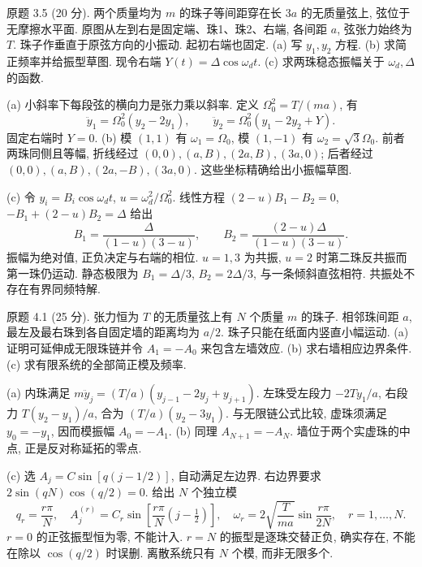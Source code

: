 \begin{exercise}\label{ps:3.5}
原题 3.5 (20 分). 两个质量均为 $m$ 的珠子等间距穿在长 $3a$ 的无质量弦上, 弦位于无摩擦水平面. 原图从左到右是固定端、珠1、珠2、右端, 各间距 $a$, 弦张力始终为 $T$. 珠子作垂直于原弦方向的小振动. 起初右端也固定. (a) 写 $y_1,y_2$ 方程. (b) 求简正频率并给振型草图. 现令右端 $Y(t)=\Delta\cos\omega_dt$. (c) 求两珠稳态振幅关于 $\omega_d,\Delta$ 的函数.
\end{exercise}
\begin{solution}
(a) 小斜率下每段弦的横向力是张力乘以斜率. 定义 $\Omega_0^2=T/(ma)$, 有
\[
\ddot y_1=\Omega_0^2(y_2-2y_1),\qquad
\ddot y_2=\Omega_0^2(y_1-2y_2+Y).
\]
固定右端时 $Y=0$. (b) 模 $(1,1)$ 有 $\omega_1=\Omega_0$, 模 $(1,-1)$ 有 $\omega_2=\sqrt3\Omega_0$. 前者两珠同侧且等幅, 折线经过 $(0,0),(a,B),(2a,B),(3a,0)$; 后者经过 $(0,0),(a,B),(2a,-B),(3a,0)$. 这些坐标精确给出小振幅草图.

(c) 令 $y_i=B_i\cos\omega_dt$, $u=\omega_d^2/\Omega_0^2$. 线性方程 $(2-u)B_1-B_2=0$, $-B_1+(2-u)B_2=\Delta$ 给出
\[
B_1=\frac{\Delta}{(1-u)(3-u)},\qquad
B_2=\frac{(2-u)\Delta}{(1-u)(3-u)}.
\]
振幅为绝对值, 正负决定与右端的相位. $u=1,3$ 为共振, $u=2$ 时第二珠反共振而第一珠仍运动. 静态极限为 $B_1=\Delta/3$, $B_2=2\Delta/3$, 与一条倾斜直弦相符. 共振处不存在有界同频特解.
\end{solution}
\begin{exercise}\label{ps:4.1}
原题 4.1 (25 分). 张力恒为 $T$ 的无质量弦上有 $N$ 个质量 $m$ 的珠子. 相邻珠间距 $a$, 最左及最右珠到各自固定墙的距离均为 $a/2$. 珠子只能在纸面内竖直小幅运动. (a) 证明可延伸成无限珠链并令 $A_1=-A_0$ 来包含左墙效应. (b) 求右墙相应边界条件. (c) 求有限系统的全部简正模及频率.
\end{exercise}
\begin{solution}
(a) 内珠满足 $m\ddot y_j=(T/a)(y_{j-1}-2y_j+y_{j+1})$. 左珠受左段力 $-2Ty_1/a$, 右段力 $T(y_2-y_1)/a$, 合为 $(T/a)(y_2-3y_1)$. 与无限链公式比较, 虚珠须满足 $y_0=-y_1$, 因而模振幅 $A_0=-A_1$. (b) 同理 $A_{N+1}=-A_N$. 墙位于两个实虚珠的中点, 正是反对称延拓的零点.

(c) 选 $A_j=C\sin[q(j-1/2)]$, 自动满足左边界. 右边界要求 $2\sin(qN)\cos(q/2)=0$. 给出 $N$ 个独立模
\[
q_r=\frac{r\pi}{N},\quad
A_j^{(r)}=C_r\sin\!\left[\frac{r\pi}{N}(j-\tfrac12)\right],\quad
\omega_r=2\sqrt{\frac T{ma}}\sin\frac{r\pi}{2N},\quad r=1,\ldots,N.
\]
$r=0$ 的正弦振型恒为零, 不能计入. $r=N$ 的振型是逐珠交替正负, 确实存在, 不能在除以 $\cos(q/2)$ 时误删. 离散系统只有 $N$ 个模, 而非无限多个.
\end{solution}
